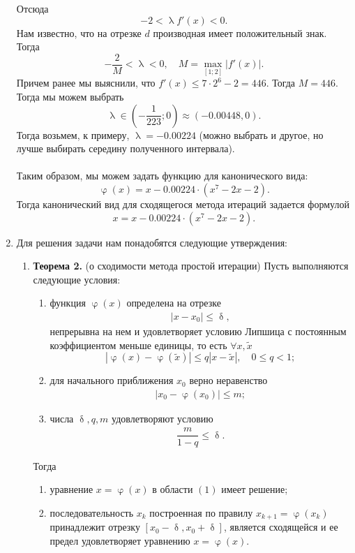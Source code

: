 \documentclass[a4paper, 12pt]{article}
\renewcommand{\leq}{\leqslant}
\renewcommand{\delta}{\updelta}
\renewcommand{\varphi}{\upvarphi}
\renewcommand{\lambda}{\uplambda}
\begin{document}
\begin{enumerate}
		 Отсюда $$-2< \lambda f'(x)< 0.$$ Нам известно, что на отрезке $d$ производная имеет положительный знак. Тогда $$-\dfrac{2}{M} < \lambda < 0,\quad M = \max_{[1; 2]}|f'(x)|.$$
		 Причем ранее мы выяснили, что $f'(x) \leq 7\cdot 2^6 - 2 = 446$. Тогда $M = 446.$
		 Тогда мы можем выбрать $$\lambda \in (-\dfrac{1}{223}; 0) \approx (-0.00448, 0).$$ Тогда возьмем, к примеру, $\lambda = -0.00224$ (можно выбрать и другое, но лучше выбирать середину полученного интервала).\\\\
		 Таким образом, мы можем задать функцию для канонического вида: $$\varphi(x) = x -0.00224 \cdot (x^7 - 2x - 2).$$
		 Тогда канонический вид для сходящегося метода итераций задается формулой $$x =  x -0.00224 \cdot (x^7 - 2x - 2).$$
		
		\newpage
		\item 
		\hypertarget{t3}{}
		Для решения задачи нам понадобятся следующие утверждения:
		\begin{enumerate}
			\item \textbf{Теорема 2.}
			(о сходимости метода простой итерации)
			Пусть выполняются следующие условия:\begin{enumerate}
				\item функция $\varphi(x)$ определена на отрезке \begin{eqnarray}
					|x - x_0| \leq \delta,
				\end{eqnarray} непрерывна на нем и удовлетворяет условию Липшица с постоянным коэффициентом меньше единицы, то есть $\forall x, \widetilde{x}$ $$|\varphi(x) - \varphi(\widetilde{x})| \leq q |x - \widetilde{x}| ,\quad 0 \leq q < 1;$$
				\item для начального приближения $x_0$ верно неравенство \begin{eqnarray}
					|x_0 - \varphi(x_0)| \leq m;
				\end{eqnarray}
				\item числа $\delta, q, m$ удовлетворяют условию 
				\begin{eqnarray}
					\dfrac{m}{1-q}\leq \delta.
				\end{eqnarray}
			\end{enumerate}
			Тогда \begin{enumerate}
				\item уравнение $x = \varphi(x)$ в области $(1)$ имеет решение;
				\item последовательность $x_k$ построенная по правилу $x_{k+1} = \varphi(x_k)$ принадлежит отрезку $[x_0 - \delta, x_0 + \delta]$, является сходящейся и ее предел удовлетворяет уравнению $x = \varphi(x)$.

\end{enumerate}
\end{enumerate}
\end{enumerate}
\end{document}
